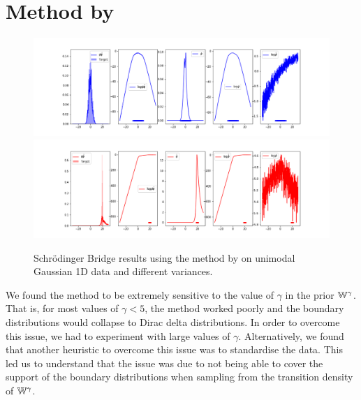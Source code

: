\documentclass[a4paper,12pt,twoside,openright]{report}
\theoremstyle{definition}
\begin{document}
\section{Method by \cite{pavon2018data}}
\begin{figure}[t]
    \centering
    \includegraphics[scale=0.4,trim={2.3cm 0.2cm 1.5cm 0}, clip]{images/Pavon/Forward_bigvar_test_working.png}\\\vspace{-0.2cm}
    \includegraphics[scale=0.4,trim={2.3cm 0 1.5cm 1.5cm}, clip]{images/Pavon/Backward_bigvar_test_working.png} 
    \caption{Schrödinger Bridge results using the method by \cite{pavon2018data} on unimodal Gaussian 1D data and different variances. }
    \label{fig:small_to_big}
\end{figure}
We found the method \cite{pavon2018data} to be extremely sensitive to the value of $\gamma$ in the prior $\mathbb{W}^{\gamma}$. That is, for most values of $\gamma < 5$, the method worked poorly and the boundary distributions would collapse to Dirac delta distributions. In order to overcome this issue, we had to experiment with large values of $\gamma$. Alternatively, we found that another heuristic to overcome this issue was to standardise the data.  This led us to understand that the issue was due to not being able to cover the support of the boundary distributions when sampling from the transition density of $\mathbb{W}^{\gamma}$. 
\end{document}
